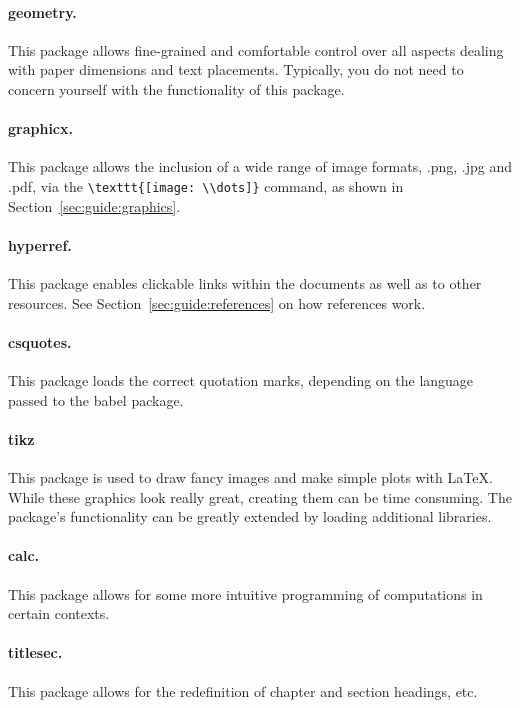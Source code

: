\paragraph{geometry.}
This package allows fine-grained and comfortable control over all aspects
dealing with paper dimensions and text placements.
Typically, you do not need to concern yourself with the functionality of this
package.


\paragraph{graphicx.}
This package allows the inclusion of a wide range of image formats, \eg{}
\mbox{.png}, \mbox{.jpg} and \mbox{.pdf}, via the
\verb+\texttt{[image: \\dots]}+ command, as shown in
Section~\ref{sec:guide:graphics}.


\paragraph{hyperref.}
This package enables clickable links within the documents as well as to other
resources.
See Section~\ref{sec:guide:references} on how references work.


\paragraph{csquotes.}
This package loads the correct quotation marks, depending on the language
passed to the babel package.


\paragraph{tikz}
This package is used to draw fancy images and make simple plots with \LaTeX{}.
While these graphics look really great, creating them can be time consuming.
The package's functionality can be greatly extended by loading additional
libraries.


\paragraph{calc.}
This package allows for some more intuitive programming of computations in
certain contexts.


\paragraph{titlesec.}
This package allows for the redefinition of chapter and section headings, etc.





